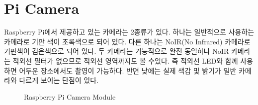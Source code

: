 \documentclass[11pt
  , a4paper
  , article
  , oneside
]{memoir}
\begin{document}
\section{Pi Camera}
Raspberry Pi에서 제공하고 있는 카메라는 2종류가 있다. 하나는 일반적으로 사용하는 카메라로 기판 색이 
초록색으로 되어 있다. 다른 하나는 NoIR(No Infrared) 카메라로 기판색이 검은색으로 되어 있다. 두 카메라는 
기능적으로 완전 동일하나 NoIR 카메라는 적외선 필터가 없으므로 적외선 영역까지도 볼 수있다. 
즉 적외선 LED와 함께 사용하면 어두운 장소에서도 촬영이 가능하다. 반면 낮에는 실제 색감 및 밝기가 일반
카메라와 다르게 보이는 단점이 있다.
\begin{figure}
  \centering
  \hfill
  \caption{Raspberry Pi Camera Module}
  \label{fig:rpi_cam}
\end{figure}
\end{document}
